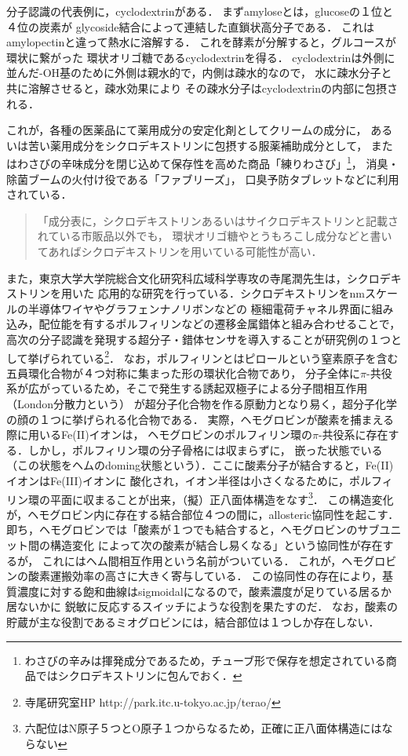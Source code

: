\documentclass[uplatex,dvipdfmx]{jsarticle}
\begin{document}
分子認識の代表例に，cyclodextrinがある．
まずamyloseとは，glucoseの１位と４位の炭素が
glycoside結合によって連結した直鎖状高分子である．
これはamylopectinと違って熱水に溶解する．
これを酵素が分解すると，グルコースが環状に繋がった
環状オリゴ糖であるcyclodextrinを得る．
cyclodextrinは外側に並んだ-OH基のために外側は親水的で，内側は疎水的なので，
水に疎水分子と共に溶解させると，疎水効果により
その疎水分子はcyclodextrinの内部に包摂される．

これが，各種の医薬品にて薬用成分の安定化剤としてクリームの成分に，
あるいは苦い薬用成分をシクロデキストリンに包摂する服薬補助成分として，
またはわさびの辛味成分を閉じ込めて保存性を高めた商品「練りわさび」\footnote{わさびの辛みは揮発成分であるため，チューブ形で保存を想定されている商品ではシクロデキストリンに包んでおく．}，
消臭・除菌ブームの火付け役である「ファブリーズ」，
口臭予防タブレットなどに利用されている\cite{有賀克彦}．
\begin{quote}
    「成分表に，シクロデキストリンあるいはサイクロデキストリンと記載されている市販品以外でも，
    環状オリゴ糖やとうもろこし成分などと書いてあればシクロデキストリンを用いている可能性が高い．\cite{有賀克彦}
\end{quote}

また，東京大学大学院総合文化研究科広域科学専攻の寺尾潤先生は，シクロデキストリンを用いた
応用的な研究を行っている．シクロデキストリンをnmスケールの半導体ワイヤやグラフェンナノリボンなどの
極細電荷チャネル界面に組み込み，配位能を有するポルフィリンなどの遷移金属錯体と組み合わせることで，
高次の分子認識を発現する超分子・錯体センサを導入することが研究例の１つとして挙げられている\footnote{寺尾研究室HP http://park.itc.u-tokyo.ac.jp/terao/}．
なお，ポルフィリンとはピロールという窒素原子を含む五員環化合物が４つ対称に集まった形の環状化合物であり，
分子全体に$\pi$-共役系が広がっているため，そこで発生する誘起双極子による分子間相互作用（London分散力という）
が超分子化合物を作る原動力となり易く，超分子化学の顔の１つに挙げられる化合物である．
実際，ヘモグロビンが酸素を捕まえる際に用いるFe(II)イオンは，
ヘモグロビンのポルフィリン環の$\pi$-共役系に存在する．しかし，ポルフィリン環の分子骨格には収まらずに，
嵌った状態でいる（この状態をヘムのdoming状態という）．ここに酸素分子が結合すると，Fe(II)イオンはFe(III)イオンに
酸化され，イオン半径は小さくなるために，ポルフィリン環の平面に収まることが出来，（擬）正八面体構造をなす\footnote{六配位はN原子５つとO原子１つからなるため，正確に正八面体構造にはならない}．
この構造変化が，ヘモグロビン内に存在する結合部位４つの間に，allosteric協同性を起こす．
即ち，ヘモグロビンでは「酸素が１つでも結合すると，ヘモグロビンのサブユニット間の構造変化
によって次の酸素が結合し易くなる」という協同性が存在するが，
これにはヘム間相互作用という名前がついている．
これが，ヘモグロビンの酸素運搬効率の高さに大きく寄与している．
この協同性の存在により，基質濃度に対する飽和曲線はsigmoidalになるので，酸素濃度が足りている居るか居ないかに
鋭敏に反応するスイッチにような役割を果たすのだ．
なお，酸素の貯蔵が主な役割であるミオグロビンには，結合部位は１つしか存在しない．
\end{document}

